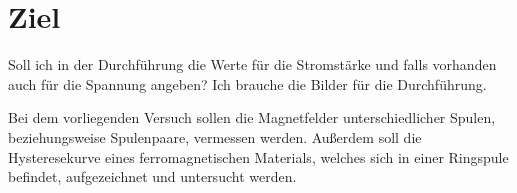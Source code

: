 \section{Ziel}
\label{sec:Ziel}

Soll ich in der Durchführung die Werte für die Stromstärke und falls vorhanden auch für die Spannung angeben?
Ich brauche die Bilder für die Durchführung.


Bei dem vorliegenden Versuch sollen die Magnetfelder unterschiedlicher Spulen, beziehungsweise Spulenpaare, 
vermessen werden. Außerdem soll die Hysteresekurve eines ferromagnetischen Materials, welches sich in einer
Ringspule befindet, aufgezeichnet und untersucht werden.



